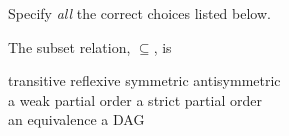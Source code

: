 \documentclass[handout]{mcs}
\begin{document}



\LARGE{
Specify \emph{all} the correct choices listed below.

The subset relation, $\subseteq$, is

\begin{center}
transitive \qquad reflexive \qquad symmetric \qquad antisymmetric\\  %
a weak partial order \qquad a strict partial order\\
 an equivalence \qquad a DAG
\end{center}
}


\end{document}
